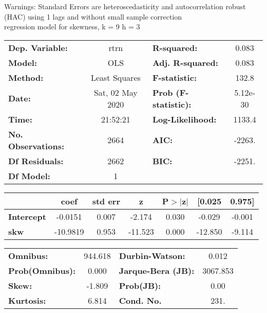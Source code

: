Warnings: \newline
 [1] Standard Errors are heteroscedasticity and autocorrelation robust (HAC) using 1 lags and without small sample correction\\ 

regression model for skewness, k = 9 h = 3\begin{center}
\begin{tabular}{lclc}
\toprule
\textbf{Dep. Variable:}    &       rtrn       & \textbf{  R-squared:         } &     0.083   \\
\textbf{Model:}            &       OLS        & \textbf{  Adj. R-squared:    } &     0.083   \\
\textbf{Method:}           &  Least Squares   & \textbf{  F-statistic:       } &     132.8   \\
\textbf{Date:}             & Sat, 02 May 2020 & \textbf{  Prob (F-statistic):} &  5.12e-30   \\
\textbf{Time:}             &     21:52:21     & \textbf{  Log-Likelihood:    } &    1133.4   \\
\textbf{No. Observations:} &        2664      & \textbf{  AIC:               } &    -2263.   \\
\textbf{Df Residuals:}     &        2662      & \textbf{  BIC:               } &    -2251.   \\
\textbf{Df Model:}         &           1      & \textbf{                     } &             \\
\bottomrule
\end{tabular}
\begin{tabular}{lcccccc}
                   & \textbf{coef} & \textbf{std err} & \textbf{z} & \textbf{P$> |$z$|$} & \textbf{[0.025} & \textbf{0.975]}  \\
\midrule
\textbf{Intercept} &      -0.0151  &        0.007     &    -2.174  &         0.030        &       -0.029    &       -0.001     \\
\textbf{skw}       &     -10.9819  &        0.953     &   -11.523  &         0.000        &      -12.850    &       -9.114     \\
\bottomrule
\end{tabular}
\begin{tabular}{lclc}
\textbf{Omnibus:}       & 944.618 & \textbf{  Durbin-Watson:     } &    0.012  \\
\textbf{Prob(Omnibus):} &   0.000 & \textbf{  Jarque-Bera (JB):  } & 3067.853  \\
\textbf{Skew:}          &  -1.809 & \textbf{  Prob(JB):          } &     0.00  \\
\textbf{Kurtosis:}      &   6.814 & \textbf{  Cond. No.          } &     231.  \\
\bottomrule
\end{tabular}
\end{center}

